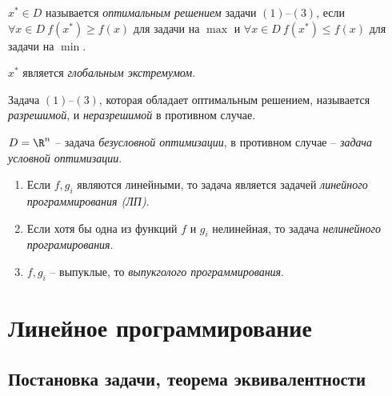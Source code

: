 \begin{definition}
	$x^* \in D$ называется \emph{оптимальным решением} задачи $(1)$--$(3)$, если $\forall x \in D \ f(x^*)\geqslant f(x)$ для задачи на $\max$ и $\forall x \in D \ f(x^*)\leqslant f(x)$ для задачи на $\min$.

	$x^*$ является \emph{глобальным экстремумом}.
\end{definition}

\begin{definition}
	Задача $(1)$--$(3)$, которая обладает оптимальным решением, называется \emph{разрешимой}, и \emph{неразрешимой} в противном случае.

	$D = \R^n$ -- задача \emph{безусловной оптимизации}, в противном случае -- \emph{задача условной оптимизации}.
\end{definition}

\begin{note}[Классификация]\leavevmode
	\begin{enumerate}
		\item Если $f,g_i$ являются линейными, то задача является задачей \emph{линейного программирования (ЛП)}.
		\item Если хотя бы одна из функций $f$ и $g_i$ нелинейная, то задача \emph{нелинейного програмирования}.
		\item $f,g_i$ -- выпуклые, то \emph{выпукголого программирования}.
	\end{enumerate}
\end{note}

\chapter{Линейное программирование}

\section{Постановка задачи, теорема эквивалентности}

